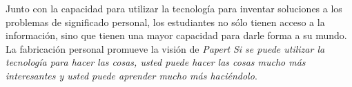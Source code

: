 \begin{itemize}
    Junto con la capacidad para utilizar la tecnología para inventar soluciones
    a los problemas de significado personal, los estudiantes no sólo tienen
    acceso a la información, sino que tienen una mayor capacidad para darle
    forma a su mundo. La fabricación personal promueve la visión de
    \textit{Papert} \emph{Si se puede utilizar la tecnología para hacer las
        cosas, usted puede hacer las cosas mucho más interesantes y usted puede
        aprender mucho más haciéndolo}\cite{papertian:const}.

\end{itemize}



